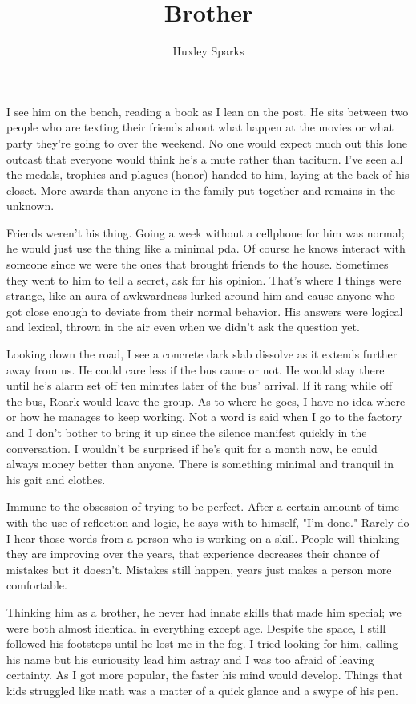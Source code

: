 \author{Huxley Sparks}
\title{Brother}
    I see him on the bench, reading a book as I lean on the post. He sits between two people who are texting their friends
about what happen at the movies or what party they're going to over the weekend. No one would expect much out this lone
outcast that everyone would think he's a mute rather than taciturn. I've seen all the medals, trophies and plagues (honor)
handed to him, laying at the back of his closet. More awards than anyone in the family put together and remains in the
unknown.

    Friends weren't his thing. Going a week without a cellphone for him was normal; he would just use the thing like a 
minimal pda. Of course he knows interact with someone since we were the ones that brought friends to the house. Sometimes
they went to him to tell a secret, ask for his opinion. That's where I things were strange, like an aura of awkwardness
lurked around him and cause anyone who got close enough to deviate from their normal behavior. His answers were logical
and lexical, thrown in the air even when we didn't ask the question yet.

    Looking down the road, I see a concrete dark slab dissolve as it extends further away from us. He could care less if the
bus came or not. He would stay there until he's alarm set off ten minutes later of the bus' arrival. If it rang while
off the bus, Roark would leave the group. As to where he goes, I have no idea where or how he manages to keep working. 
Not a word is said when I go to the factory and I don't bother to bring it up since the silence manifest quickly in the
conversation. I wouldn't be surprised if he's quit for a month now, he could always money better than anyone. There
is something minimal and tranquil in his gait and clothes.

    Immune to the obsession of trying to be perfect. After a certain amount of time with the use of reflection and
logic, he says with to himself, "I'm done." Rarely do I hear those words from a person who is working on a skill. People
will thinking they are improving over the years, that experience decreases their chance of mistakes but it doesn't.
Mistakes still happen, years just makes a person more comfortable. 

    Thinking him as a brother, he never had innate skills that made him special; we were both almost identical in
everything except age. Despite the space, I still followed his footsteps until he lost me in the fog. I tried looking
for him, calling his name but his curiousity lead him astray and I was too afraid of leaving certainty. As I got more
popular, the faster his mind would develop. Things that kids struggled like math was a matter of a quick glance and
a swype of his pen. 

